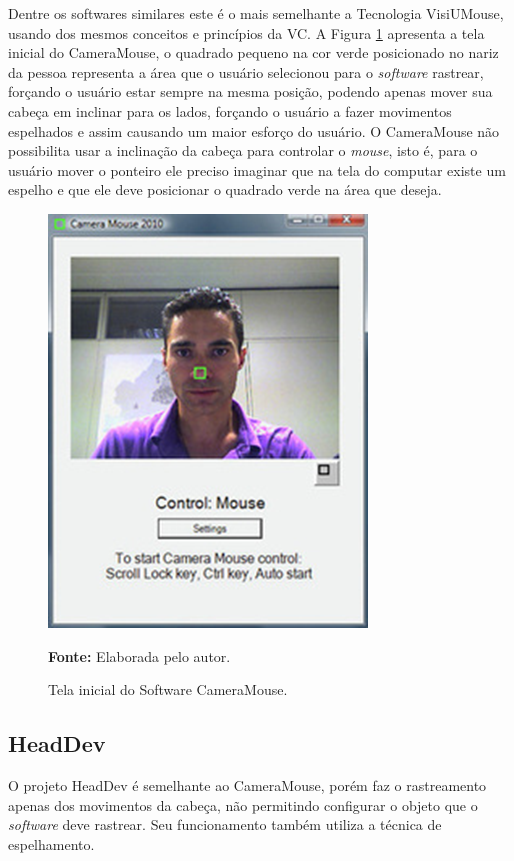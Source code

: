 Dentre os softwares similares este é o mais semelhante a Tecnologia VisiUMouse, usando dos mesmos conceitos e princípios da VC. A Figura \ref{fig:camera-mouse} apresenta a tela inicial do CameraMouse, o quadrado pequeno na cor verde posicionado no nariz da pessoa representa a área que o usuário selecionou para o \textit{software} rastrear, forçando o usuário estar sempre na mesma posição, podendo apenas mover sua cabeça em inclinar para os lados, forçando o usuário a fazer movimentos espelhados  e assim causando um maior esforço do usuário. O CameraMouse não possibilita usar a inclinação da cabeça para controlar o \textit{mouse}, isto é, para o usuário mover o ponteiro ele preciso imaginar que na tela do computar existe um espelho e que ele deve posicionar o quadrado verde na área que deseja.

\begin{figure}[ht]
 \caption{Tela inicial do Software CameraMouse.} 
\centering \includegraphics[scale=1]{img/camera-mouse.png}

\textbf{Fonte:} Elaborada pelo autor.
\label{fig:camera-mouse}
\end{figure}

\subsection{HeadDev}

O projeto HeadDev  é semelhante ao CameraMouse, porém faz o rastreamento apenas dos movimentos da cabeça, não permitindo configurar o objeto que o \textit{software} deve rastrear. Seu funcionamento também utiliza a técnica de espelhamento.


